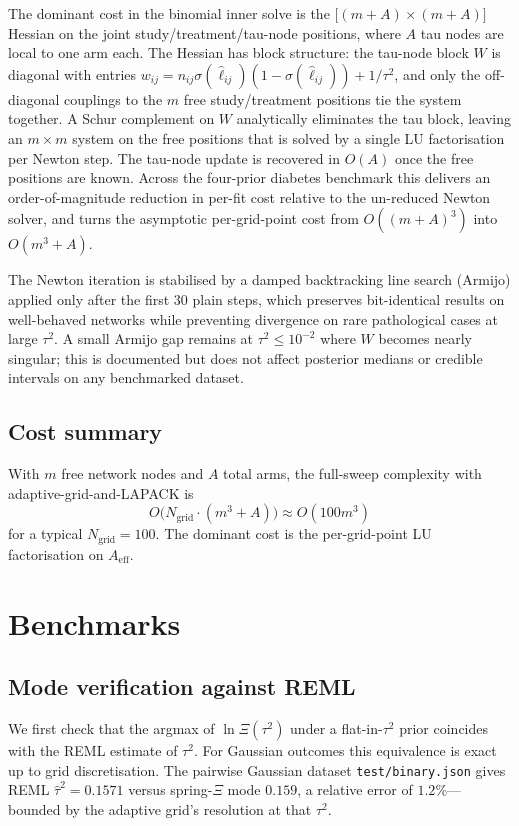 \documentclass[12pt]{article}
\begin{document}
The dominant cost in the binomial inner solve is the
$\bigl[(m + A) \times (m + A)\bigr]$ Hessian on the joint
study/treatment/tau-node positions, where $A$ tau nodes are
local to one arm each. The Hessian has block structure:
the tau-node block $W$ is diagonal with entries
$w_{ij} = n_{ij}\sigma(\hat\ell_{ij})(1-\sigma(\hat\ell_{ij}))
+ 1/\tau^2$, and only the off-diagonal couplings to the
$m$ free study/treatment positions tie the system together.
A Schur complement on $W$ analytically eliminates the tau
block, leaving an $m \times m$ system on the free positions
that is solved by a single LU factorisation per Newton step.
The tau-node update is recovered in $O(A)$ once the free
positions are known. Across the four-prior diabetes benchmark
this delivers an order-of-magnitude reduction in per-fit cost
relative to the un-reduced Newton solver, and turns the
asymptotic per-grid-point cost from $O((m+A)^3)$ into
$O(m^3 + A)$.

The Newton iteration is stabilised by a damped backtracking line
search (Armijo) applied only after the first 30 plain steps,
which preserves bit-identical results on well-behaved networks
while preventing divergence on rare pathological cases at large
$\tau^2$. A small Armijo gap remains at $\tau^2 \le 10^{-2}$
where $W$ becomes nearly singular; this is documented but does
not affect posterior medians or credible intervals on any
benchmarked dataset.

\subsection{Cost summary}

With $m$ free network nodes and $A$ total arms, the full-sweep
complexity with adaptive-grid-and-LAPACK is
\[
O\bigl(N_{\text{grid}} \cdot (m^3 + A)\bigr)
\approx
O(100 m^3)
\]
for a typical $N_{\text{grid}} = 100$. The dominant cost is the
per-grid-point LU factorisation on $A_{\text{eff}}$.

\section{Benchmarks}\label{sec:benchmarks}

\subsection{Mode verification against REML}\label{sec:mode-verify}

We first check that the argmax of $\ln \Xi(\tau^2)$ under a
flat-in-$\tau^2$ prior coincides with the REML estimate of
$\tau^2$. For Gaussian outcomes this equivalence is exact up to
grid discretisation. The pairwise Gaussian dataset
\texttt{test/binary.json} gives REML
$\hat{\tau}^2 = 0.1571$ versus spring-$\Xi$ mode $0.159$, a
relative error of $1.2\%$---bounded by the adaptive grid's
resolution at that $\tau^2$.
\end{document}
